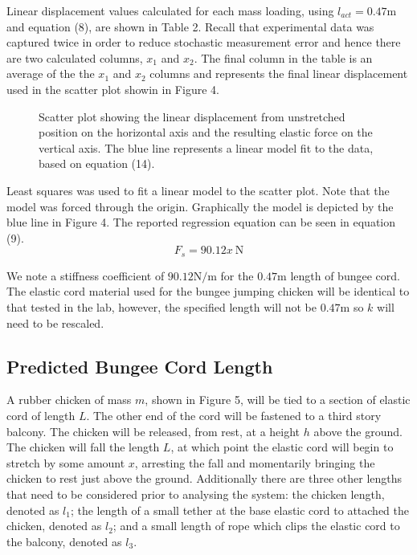 \documentclass[a4paper]{article}
\begin{document}
Linear displacement values calculated for each mass loading, using $l_{act} = 0.47\si{\meter}$ and equation (8), are shown in Table 2. Recall that experimental data was captured twice in order to reduce stochastic measurement error and hence there are two calculated columns, $x_1$ and $x_2$. The final column in the table is an average of the the $x_1$ and $x_2$ columns and represents the final linear displacement used in the scatter plot showin in Figure 4. 

\begin{figure}[h]
	\centering
	\caption{Scatter plot showing the linear displacement from unstretched position on the horizontal axis and the resulting elastic force on the vertical axis. The blue line represents a linear model fit to the data, based on equation (14).}
\end{figure}

Least squares was used to fit a linear model to the scatter plot. Note that the model was forced through the origin. Graphically the model is depicted by the blue line in Figure 4. The reported regression equation can be seen in equation (9).
\begin{equation}
F_s = 90.12x \ \si{\newton}
\end{equation}

We note a stiffness coefficient of $90.12\si{\newton\per\meter}$ for the $0.47\si{\meter}$ length of bungee cord. The elastic cord material used for the bungee jumping chicken will be identical to that tested in the lab, however, the specified length will not be $0.47\si{\meter}$ so $k$ will need to be rescaled.

\subsection{Predicted Bungee Cord Length}
A rubber chicken of mass $m$, shown in Figure 5, will be tied to a section of elastic cord of length $L$. The other end of the cord will be fastened to a third story balcony. The chicken will be released, from rest, at a height $h$ above the ground. The chicken will fall the length $L$, at which point the elastic cord will begin to stretch by some amount $x$, arresting the fall and momentarily bringing the chicken to rest just above the ground. Additionally there are three other lengths that need to be considered prior to analysing the system: the chicken length, denoted as $l_1$; the length of a small tether at the base elastic cord to attached the chicken, denoted as $l_2$; and a small length of rope which clips the elastic cord to the balcony, denoted as $l_3$.\\
\end{document}
